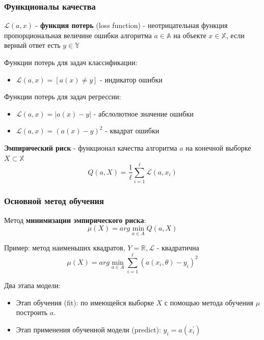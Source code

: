 \documentclass{beamer}
\begin{document}
	\begin{frame}
		\frametitle{Функционалы качества}
		
		$\mathcal{L}(a, x)$ - \textbf{функция потерь} (loss function)  - неотрицательная функция пропорциональная величине ошибки алгоритма $a \in \mathbb{A}$ на объекте $x \in \mathbb{X}$, если верный ответ есть $y \in \mathbb{Y}$
		
		\vspace{5pt}
		
		Функции потерь для задач классификации:
		\begin{itemize}
			\item $\mathcal{L}(a, x) = [a(x) \not= y]$ - индикатор ошибки
		\end{itemize}
		
		Функции потерь для задач регрессии:
		\begin{itemize}
			\item $\mathcal{L}(a, x) = |a(x) - y|$ - абслолютное значение ошибки
			\item $\mathcal{L}(a, x) = (a(x) - y)^2$ - квадрат ошибки
		\end{itemize}
		
		\vspace{5pt}
		
		\textbf{Эмпирический риск} - функционал качества алгоритма $a$ на конечной выборке $X \subset \mathbb{X}$
		$$
		Q(a, X) = \frac{1}{\ell} \sum_{i=1}^{\ell} \mathcal{L}(a, x_i)
		$$
	\end{frame}		
		
		
	\begin{frame}
		\frametitle{Основной метод обучения}
		Метод \textbf{минимизации эмпирического риска}:
		$$
		\mu(X) = arg \min_{a \in A} Q(a, X)
		$$
		
		Пример: метод наименьших квадратов, $Y = \mathbb{R}, \mathcal{L}$ - квадратична
		$$
		\mu(X) = arg \min_{a \in A} \sum_{i=1}^{\ell} (a(x_i, \theta) - y_i)^{2}
		$$
		
		\vspace{5pt}
		
		Два этапа модели:
		\begin{itemize}
			\item Этап обучения (fit): по имеющейся выборке $X$ с помощью метода обучения $\mu$ построить $a$.
		
			\item Этап применения обученной модели (predict): $\hat{y}_i = a(x_i^{'})$
		\end{itemize}
	\end{frame}
		
\end{document}
